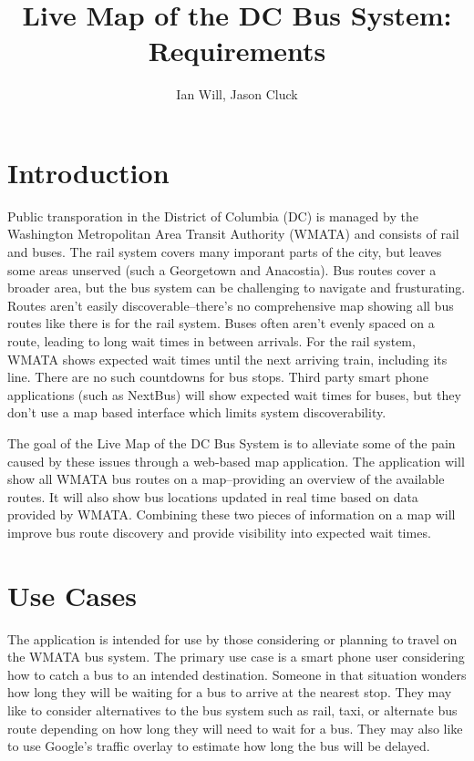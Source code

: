 \documentclass[12pt]{article}
\title{Live Map of the DC Bus System: Requirements}
\author{Ian Will, Jason Cluck}
\date{}
\begin{document}
\maketitle

\section*{Introduction}
Public transporation in the District of Columbia (DC) is managed by the Washington Metropolitan Area Transit Authority (WMATA) and consists of rail and buses.  The rail system covers many imporant parts of the city, but leaves some areas unserved (such a Georgetown and Anacostia).  Bus routes cover a broader area, but the bus system can be challenging to navigate and frusturating.  Routes aren't easily discoverable--there's no comprehensive map showing all bus routes like there is for the rail system.  Buses often aren't evenly spaced on a route, leading to long wait times in between arrivals.  For the rail system, WMATA shows expected wait times until the next arriving train, including its line.  There are no such countdowns for bus stops.  Third party smart phone applications (such as NextBus) will show expected wait times for buses, but they don't use a map based interface which limits system discoverability.     

The goal of the Live Map of the DC Bus System is to alleviate some of the pain caused by these issues through a web-based map application.  The application will show all WMATA bus routes on a map--providing an overview of the available routes.  It will also show bus locations updated in real time based on data provided by WMATA.  Combining these two pieces of information on a map will improve bus route discovery and provide visibility into expected wait times.

\section*{Use Cases}

The application is intended for use by those considering or planning to travel on the WMATA bus system.  The primary use case is a smart phone user considering how to catch a bus to an intended destination.  Someone in that situation wonders how long they will be waiting for a bus to arrive at the nearest stop.  They may like to consider alternatives to the bus system such as rail, taxi, or alternate bus route depending on how long they will need to wait for a bus.  They may also like to use Google's traffic overlay to estimate how long the bus will be delayed.
\end{document}
